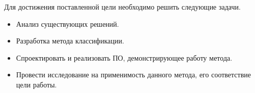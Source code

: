 Для достижения поставленной цели необходимо решить следующие задачи.
\begin{itemize}
\item Анализ существующих решений.
\item Разработка метода классификации.
\item Спроектировать и реализовать ПО, демонстрирующее работу метода.
\item Провести исследование на применимость данного метода, его соответствие цели работы.
\end{itemize}
